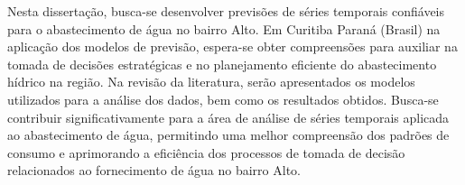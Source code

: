 Nesta dissertação, busca-se desenvolver previsões de séries temporais confiáveis para o abastecimento de água no bairro Alto. Em Curitiba Paraná (Brasil) na aplicação dos modelos de previsão, espera-se obter compreensões para auxiliar na tomada de decisões estratégicas e no planejamento eficiente do abastecimento hídrico na região. Na revisão da literatura, serão apresentados os modelos utilizados para a análise dos dados, bem como os resultados obtidos. Busca-se contribuir significativamente para a área de análise de séries temporais aplicada ao abastecimento de água, permitindo uma melhor compreensão dos padrões de consumo e aprimorando a eficiência dos processos de tomada de decisão relacionados ao fornecimento de água no bairro Alto.


          

   

    

    

    